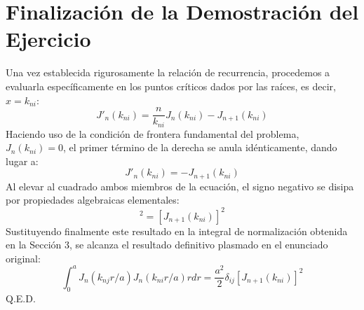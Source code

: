 \documentclass[11pt,a4paper]{article}
\begin{document}
\section{Finalización de la Demostración del Ejercicio}
Una vez establecida rigurosamente la relación de recurrencia, procedemos a evaluarla específicamente en los puntos críticos dados por las raíces, es decir, $x = k_{ni}$:
\begin{equation}
	J'_n(k_{ni}) = \frac{n}{k_{ni}} J_n(k_{ni}) - J_{n+1}(k_{ni})
\end{equation}
Haciendo uso de la condición de frontera fundamental del problema, $J_n(k_{ni}) = 0$, el primer término de la derecha se anula idénticamente, dando lugar a:
\begin{equation}
	J'_n(k_{ni}) = -J_{n+1}(k_{ni})
\end{equation}
Al elevar al cuadrado ambos miembros de la ecuación, el signo negativo se disipa por propiedades algebraicas elementales:
\begin{equation}
	[J'_n(k_{ni})]^2 = [J_{n+1}(k_{ni})]^2
\end{equation}
Sustituyendo finalmente este resultado en la integral de normalización obtenida en la Sección 3, se alcanza el resultado definitivo plasmado en el enunciado original:
\begin{equation}
	\int_0^a J_n(k_{nj}r/a)J_n(k_{ni}r/a)rdr = \frac{a^2}{2}\delta_{ij}[J_{n+1}(k_{ni})]^2
\end{equation}
Q.E.D.
\end{document}

